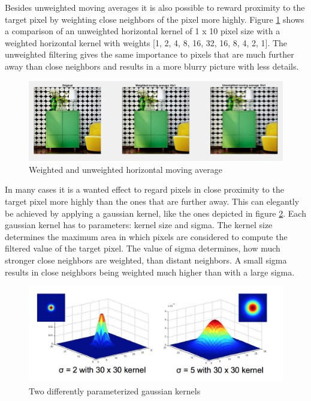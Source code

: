 \documentclass[11pt]{article}
\begin{document}
Besides unweighted moving averages it is also possible to reward proximity to the target pixel by weighting close neighbors of the pixel more highly. Figure \ref{fig:task11} shows a comparison of an unweighted horizontal kernel of 1 x 10 pixel size with a weighted horizontal kernel with weights [1, 2, 4, 8, 16, 32, 16, 8, 4, 2, 1]. The unweighted filtering gives the same importance to pixels that are much further away than close neighbors and results in a more blurry picture with less details.

\begin{figure}[!hbt]
  \includegraphics[width=\textwidth]{task11}
  \caption{Weighted and unweighted horizontal moving average}
  \label{fig:task11}
\end{figure}

In many cases it is a wanted effect to regard pixels in close proximity to the target pixel more highly than the ones that are further away. This can elegantly be achieved by applying a gaussian kernel, like the ones depicted in figure \ref{fig:task12}. Each gaussian kernel has to parameters: kernel size and sigma. The kernel size determines the maximum area in which pixels are considered to compute the filtered value of the target pixel. The value of sigma determines, how much stronger close neighbors are weighted, than distant neighbors. A small sigma results in close neighbors being weighted much higher than with a large sigma.

\begin{figure}[!hbt]
  \includegraphics[width=\textwidth]{task12}
  \caption{Two differently parameterized gaussian kernels}
  \label{fig:task12}
\end{figure}
\end{document}
